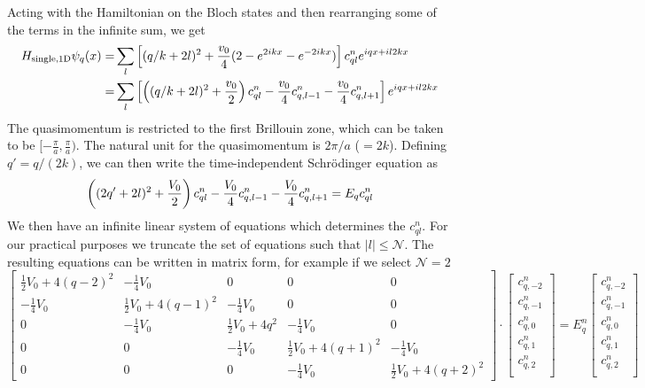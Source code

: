 Acting with the Hamiltonian on the Bloch states and then rearranging some of
the terms in the infinite sum, we get \begin{equation}
\begin{split}
  H_{\text{single,1D}} \psi_{q}(x) = &  
      \sum_{l} \left[(q/k+2l)^{2} 
      + \frac{v_{0}}{4}(2-e^{2ikx}-e^{-2ikx}) \right]
      c_{ql}^{n} e^{iqx+il2kx} \\ 
                                  = &  
      \sum_{l} \left[ \left(  (q/k+2l)^{2} 
      + \frac{v_{0}}{2} \right) c_{ql}^{n} 
      - \frac{v_{0}}{4}c_{q,l-1}^{n} - \frac{v_{0}}{4}c_{q,l+1}^{n} \right] 
      e^{iqx+il2kx} 
\end{split}
\end{equation}
The quasimomentum is restricted to the first Brillouin zone, which can be taken
to be $[-\frac{\pi}{a}, \frac{\pi}{a})$.  The natural unit for the
quasimomentum is $2\pi/a$ ($=2k$).  Defining $q'=q/(2k)$,  we can then write
the time-independent Schr\"{o}dinger equation as 
\begin{equation}
  \left(  (2q'+2l)^{2} + \frac{V_{0}}{2} \right) c_{ql}^{n}
  - \frac{V_{0}}{4}c_{q,l-1}^{n} - \frac{V_{0}}{4}c_{q,l+1}^{n} = E_{q} c_{ql}^{n} 
\end{equation}
We then have an infinite linear system of equations which determines the
$c_{ql}^{n}$. For our practical purposes we truncate the set of equations such
that $|l|\leq\mathcal{N}$.  The resulting equations can be written in matrix form,
for example if we select $\mathcal{N}=2$ 
\begin{equation}
\left[\begin{smallmatrix}\frac{1}{2} V_{{0}} + 4 \left(q -2\right)^{2} & -
\frac{1}{4} V_{{0}} & 0 & 0 & 0\\- \frac{1}{4} V_{{0}} & \frac{1}{2} V_{{0}} +
4 \left(q -1\right)^{2} & - \frac{1}{4} V_{{0}} & 0 & 0\\0 & - \frac{1}{4}
V_{{0}} & \frac{1}{2} V_{{0}} + 4 q^{2} & - \frac{1}{4} V_{{0}} & 0\\0 & 0 & -
\frac{1}{4} V_{{0}} & \frac{1}{2} V_{{0}} + 4 \left(q + 1\right)^{2} & -
\frac{1}{4} V_{{0}}\\0 & 0 & 0 & - \frac{1}{4} V_{{0}} & \frac{1}{2} V_{{0}} +
4 \left(q + 2\right)^{2}\end{smallmatrix}\right] 
%
\cdot
\left[\begin{smallmatrix} 
  c_{q,-2}^{n} \\ 
  c_{q,-1}^{n} \\ 
  c_{q,0}^{n} \\ 
  c_{q,1}^{n} \\ 
  c_{q,2}^{n} \\ 
 \end{smallmatrix}\right]
 = E_{q}^{n} 
\left[\begin{smallmatrix} 
  c_{q,-2}^{n} \\ 
  c_{q,-1}^{n} \\ 
  c_{q,0}^{n} \\ 
  c_{q,1}^{n} \\ 
  c_{q,2}^{n} \\ 
 \end{smallmatrix}\right]
\label{eq:h1dmatrix} 
\end{equation}
